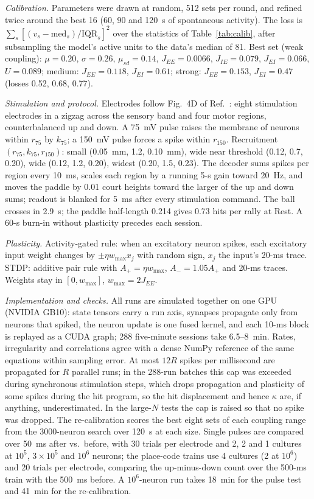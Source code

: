 \documentclass[pre,twocolumn,superscriptaddress,showpacs=false,amsmath,amssymb,nofootinbib]{revtex4-2}
\begin{document}
\emph{Calibration.} Parameters were drawn at random, 512 sets per round, and refined twice around the best 16 (60, 90 and 120~s of spontaneous activity). The loss is $\sum_s[(v_s-\mathrm{med}_s)/\mathrm{IQR}_s]^2$ over the statistics of Table~\ref{tab:calib}, after subsampling the model's active units to the data's median of 81. Best set (weak coupling): $\mu=0.20$, $\sigma=0.26$, $\mu_{sd}=0.14$, $J_{EE}=0.0066$, $J_{IE}=0.079$, $J_{EI}=0.066$, $U=0.089$; medium: $J_{EE}=0.118$, $J_{EI}=0.61$; strong: $J_{EE}=0.153$, $J_{EI}=0.47$ (losses 0.52, 0.68, 0.77).

\emph{Stimulation and protocol.} Electrodes follow Fig.~4D of Ref.~\cite{Kagan2022}: eight stimulation electrodes in a zigzag across the sensory band and four motor regions, counterbalanced up and down. A 75~mV pulse raises the membrane of neurons within $r_{75}$ by $k_{75}$; a 150~mV pulse forces a spike within $r_{150}$. Recruitment $(r_{75},k_{75},r_{150})$: small (0.05~mm, 1.2, 0.10~mm), wide near threshold (0.12, 0.7, 0.20), wide (0.12, 1.2, 0.20), widest (0.20, 1.5, 0.23). The decoder sums spikes per region every 10~ms, scales each region by a running 5-s gain toward 20~Hz, and moves the paddle by 0.01 court heights toward the larger of the up and down sums; readout is blanked for 5~ms after every stimulation command. The ball crosses in 2.9~s; the paddle half-length 0.214 gives 0.73 hits per rally at Rest. A 60-s burn-in without plasticity precedes each session.

\emph{Plasticity.} Activity-gated rule: when an excitatory neuron spikes, each excitatory input weight changes by $\pm\eta w_{\max}x_j$ with random sign, $x_j$ the input's 20-ms trace. STDP: additive pair rule with $A_+=\eta w_{\max}$, $A_-=1.05A_+$ and 20-ms traces. Weights stay in $[0,w_{\max}]$, $w_{\max}=2J_{EE}$.

\emph{Implementation and checks.} All runs are simulated together on one GPU (NVIDIA GB10): state tensors carry a run axis, synapses propagate only from neurons that spiked, the neuron update is one fused kernel, and each 10-ms block is replayed as a CUDA graph; 288 five-minute sessions take 6.5--8~min. Rates, irregularity and correlations agree with a dense NumPy reference of the same equations within sampling error. At most $12R$ spikes per millisecond are propagated for $R$ parallel runs; in the 288-run batches this cap was exceeded during synchronous stimulation steps, which drops propagation and plasticity of some spikes during the hit program, so the hit displacement and hence $\kappa$ are, if anything, underestimated. In the large-$N$ tests the cap is raised so that no spike was dropped. The re-calibration scores the best eight sets of each coupling range from the 3000-neuron search over 120~s at each size. Single pulses are compared over 50~ms after vs.\ before, with 30 trials per electrode and 2, 2 and 1 cultures at $10^5$, $3\times10^5$ and $10^6$ neurons; the place-code trains use 4 cultures (2 at $10^6$) and 20 trials per electrode, comparing the up-minus-down count over the 500-ms train with the 500~ms before. A $10^6$-neuron run takes 18~min for the pulse test and 41~min for the re-calibration.


\end{document}
